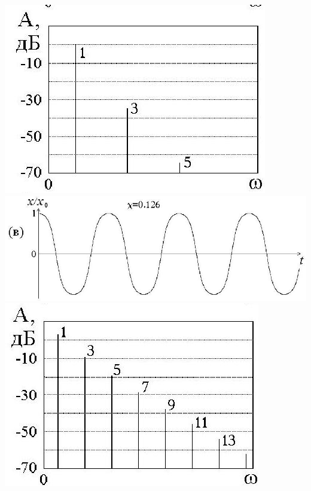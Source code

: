 \documentclass[10pt]{article}
\begin{document}
\includegraphics[max width=\textwidth, center]{2024_12_13_b73f3d6aa10f4b2a98e9g-043(5)}\\
\includegraphics[max width=\textwidth, center]{2024_12_13_b73f3d6aa10f4b2a98e9g-043(4)}\\
\includegraphics[max width=\textwidth, center]{2024_12_13_b73f3d6aa10f4b2a98e9g-043(1)}
\end{document}
